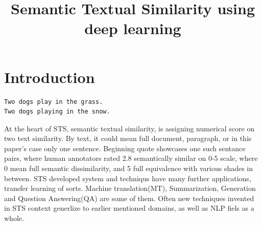 \documentclass[10pt, a4paper]{article}
\title{Semantic Textual Similarity using deep learning}
\begin{document}
\maketitleabstract

\section{Introduction}

\begin{verbatim}
Two dogs play in the grass.
Two dogs playing in the snow.
\end{verbatim}
At the heart of STS, semantic textual similarity, is assigning numerical score on two text similarity. By text, it could mean full document, paragraph, or in this paper's case only one sentence. Beginning quote showcases one such sentance pairs, where human annotators rated 2.8 semantically similar on 0-5 scale, where 0 mean full semantic dissimilarity, and 5 full equivalence with various shades in between. %
STS developed system and techniqus have many further applications, transfer learning of sorts. Machine translation(MT), Summarization, Generation and Question Answering(QA) are some of them. Often new techniques invented in STS context generlize to earlier mentioned domains, as well as NLP fiels as a whole.
\end{document}
